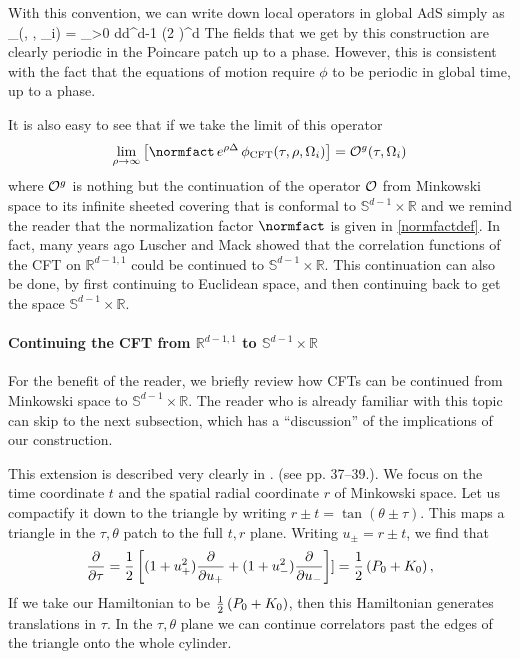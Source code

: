 With this convention, we can write down local operators in global AdS 
simply as
\be
\label{finalglobal}
\phi_{}(\tau, \rho, \Omega_i) = \int_{\omega>0} {d\omega  d^{d-1}   \over (2 \pi)^d} 
\ee 
The fields that we get by this construction are clearly periodic in the Poincare patch up to a phase. However, this is consistent with the fact that the equations of motion require $\phi$ to be periodic in global time, up to a phase. 

It is also easy to see that if we take the limit of this operator 
\[
\lim_{\rho \rightarrow \infty}  \left[\normfact\, e^{\rho \Delta}\,\phi_{\text{CFT}}(\tau, \rho, \Omega_i)\right] = {\cal O}^g(\tau, \Omega_i)
\]
where ${\cal O}^g$ is nothing but the continuation of the operator ${\cal O}$ from Minkowski space to its infinite sheeted covering that is conformal to  ${\mathbb S}^{d-1} \times {\mathbb R}$ and we remind the reader that 
the normalization factor $\normfact$ is given in \eqref{normfactdef}. In fact, many years ago Luscher and Mack \cite{Luscher:1974ez} showed that the correlation functions of the CFT on ${\mathbb R}^{d-1,1}$ could be continued to ${\mathbb S}^{d-1} \times {\mathbb R}$. This continuation can also be done, by first continuing to Euclidean space, and then continuing back to get the space ${\mathbb S}^{d-1} \times {\mathbb R}$. 

\paragraph{Continuing the CFT from ${\mathbb R}^{d-1,1}$ to ${\mathbb S}^{d-1} \times {\mathbb R}$}
For the benefit of the reader, we briefly review how CFTs can be
continued from Minkowski space to ${\mathbb S}^{d-1} \times {\mathbb R}$. The reader who is
already familiar with this topic can skip to the next subsection,
which has a ``discussion'' of the implications of our construction.

This extension is described very clearly in \cite{Aharony:1999ti}.  (see pp. 37--39.). We focus on the time coordinate $t$ and the spatial radial coordinate $r$ of Minkowski space. Let us compactify it down to the triangle by writing $r\pm t = \tan(\theta \pm \tau)$. This maps a triangle in the $\tau,\theta$ patch to the full $t,r$ plane. Writing $u_{\pm} = r \pm t$, we find that
\[
{\partial \over \partial \tau} = {1 \over 2} \left[(1 + u_{+}^2) {\partial \over \partial u_{+}} + (1 + u_{-}^2) {\partial \over \partial u_{-}} \right]]= {1 \over 2} \left(P_0 + K_0\right),
 \]
If we take our Hamiltonian to be ${1 \over 2}\left(P_0 + K_0 \right)$, then this Hamiltonian generates translations in $\tau$. In the $\tau, \theta$ plane we can continue correlators past  the edges of the triangle
onto the whole cylinder. 

